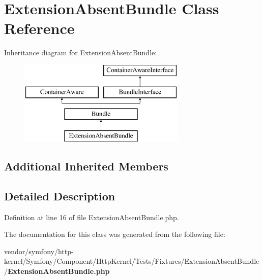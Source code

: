 \section{Extension\+Absent\+Bundle Class Reference}
\label{class_symfony_1_1_component_1_1_http_kernel_1_1_tests_1_1_fixtures_1_1_extension_absent_bundle_1_1_extension_absent_bundle}
Inheritance diagram for Extension\+Absent\+Bundle\+:\begin{figure}[H]
\begin{center}
\leavevmode
\includegraphics[height=4.000000cm]{class_symfony_1_1_component_1_1_http_kernel_1_1_tests_1_1_fixtures_1_1_extension_absent_bundle_1_1_extension_absent_bundle}
\end{center}
\end{figure}
\subsection*{Additional Inherited Members}


\subsection{Detailed Description}


Definition at line 16 of file Extension\+Absent\+Bundle.\+php.



The documentation for this class was generated from the following file\+:\begin{DoxyCompactItemize}
\item 
vendor/symfony/http-\/kernel/\+Symfony/\+Component/\+Http\+Kernel/\+Tests/\+Fixtures/\+Extension\+Absent\+Bundle/{\bf Extension\+Absent\+Bundle.\+php}\end{DoxyCompactItemize}
